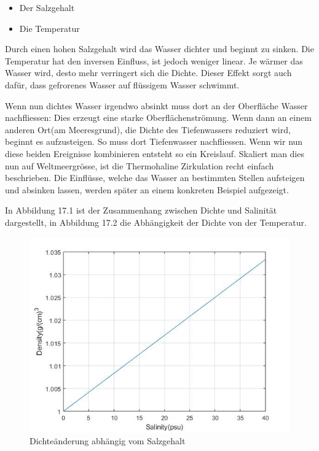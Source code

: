 \begin{itemize}
	\item Der Salzgehalt
	\item Die Temperatur
\end{itemize}

Durch einen hohen Salzgehalt wird das Wasser dichter und beginnt zu sinken. Die Temperatur hat den inversen Einfluss, ist jedoch weniger linear. Je wärmer das Wasser wird, desto mehr verringert sich die Dichte. Dieser Effekt sorgt auch dafür, dass gefrorenes Wasser auf flüssigem Wasser schwimmt.

Wenn nun dichtes Wasser irgendwo absinkt muss dort an der Oberfläche Wasser nachfliessen: Dies erzeugt eine starke Oberflächenströmung. Wenn dann an einem anderen Ort(am Meeresgrund), die Dichte des Tiefenwassers reduziert wird, beginnt es aufzusteigen. So muss dort Tiefenwasser nachfliessen. Wenn wir nun diese beiden Ereignisse kombinieren entsteht so ein Kreislauf. Skaliert man dies nun auf Weltmeergrösse, ist die Thermohaline Zirkulation recht einfach beschrieben. Die Einflüsse, welche das Wasser an bestimmten Stellen aufsteigen und absinken lassen, werden später an einem konkreten Beispiel aufgezeigt.

In Abbildung 17.1 ist der Zusammenhang zwischen Dichte und Salinität dargestellt, in Abbildung 17.2 die Abhängigkeit der Dichte von der Temperatur.


\begin{figure}
	\centering
\includegraphics[width=12cm]{thermohalin/Code/graphs/graph_salinity.jpg}
\caption{Dichteänderung abhängig vom Salzgehalt}
\end{figure}

